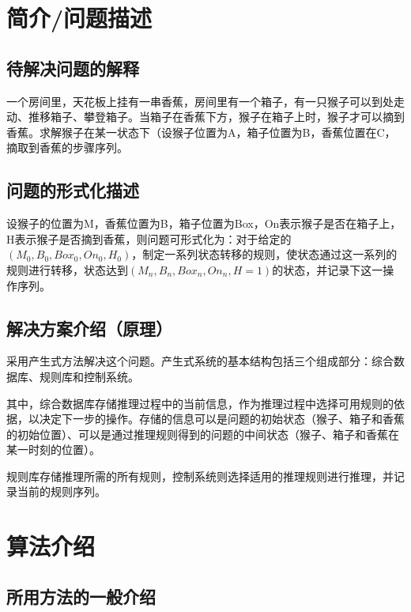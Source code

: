 \section{简介/问题描述}
\subsection{待解决问题的解释}
\par 一个房间里，天花板上挂有一串香蕉，房间里有一个箱子，有一只猴子可以到处走动、推移箱子、攀登箱子。当箱子在香蕉下方，猴子在箱子上时，猴子才可以摘到香蕉。求解猴子在某一状态下（设猴子位置为A，箱子位置为B，香蕉位置在C，摘取到香蕉的步骤序列。

\subsection{问题的形式化描述}
\par 设猴子的位置为M，香蕉位置为B，箱子位置为Box，On表示猴子是否在箱子上，H表示猴子是否摘到香蕉，则问题可形式化为：对于给定的$(M_0, B_0, Box_0, On_0, H_0)$，制定一系列状态转移的规则，使状态通过这一系列的规则进行转移，状态达到$(M_n, B_n, Box_n, On_n, H = 1)$的状态，并记录下这一操作序列。
\subsection{解决方案介绍（原理）}
\par 采用产生式方法解决这个问题。产生式系统的基本结构包括三个组成部分：综合数据库、规则库和控制系统。
\par 其中，综合数据库存储推理过程中的当前信息，作为推理过程中选择可用规则的依据，以决定下一步的操作。存储的信息可以是问题的初始状态（猴子、箱子和香蕉的初始位置）、可以是通过推理规则得到的问题的中间状态（猴子、箱子和香蕉在某一时刻的位置）。
\par 规则库存储推理所需的所有规则，控制系统则选择适用的推理规则进行推理，并记录当前的规则序列。


\section{算法介绍}
\subsection{所用方法的一般介绍}
